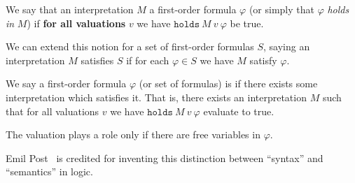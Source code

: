 \begin{node}[Semantics]
\begin{definition}\label{fol-000E}%
We say that an interpretation $M$  a first-order
formula $\varphi$ (or simply that $\varphi$ \textit{holds in} $M$) if
\textbf{for all valuations} $v$ we have $\mathtt{holds}~M~v~\varphi$
be true.

We can extend this notion for a set of first-order formulas $S$, saying
an interpretation $M$ satisfies $S$ if for each $\varphi\in S$ we have
$M$ satisfy $\varphi$.
\end{definition}

\begin{definition}\label{fol-000F}%
We say a first-order formula $\varphi$ (or set of formulas) is
 if there exists some interpretation which satisfies it.
That is, there exists an interpretation $M$ such that for all valuations
$v$ we have $\mathtt{holds}~M~v~\varphi$ evaluate to true.

The valuation plays a role only if there are free variables in $\varphi$.
\end{definition}
\end{node}

\begin{node}[References]\label{fol-000J}%
Emil Post~\cite{post1921introduction} is credited for inventing this
distinction between ``syntax'' and ``semantics'' in logic.
\end{node}
